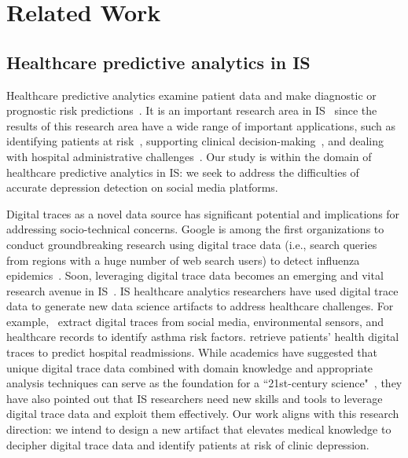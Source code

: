 \section{Related Work} \label{sec:related}

\subsection{Healthcare predictive analytics in IS}\label{sec:related:one}

Healthcare predictive analytics examine patient data and make diagnostic or prognostic risk predictions~\citep{shmueli_predictive_2011}. It is an important research area in IS~\citep{shmueli_predictive_2011} since the results of this research area have a wide range of important applications, such as identifying patients at risk~, supporting clinical decision-making~\citep{ben-assuli_trajectories_2020}, and dealing with hospital administrative challenges~\citep{meyer_machine_2014}. Our study is within the domain of healthcare predictive analytics in IS: we seek to address the difficulties of accurate depression detection on social media platforms. 

Digital traces as a novel data source has significant potential and implications for addressing socio-technical concerns. Google is among the first organizations to conduct groundbreaking research using digital trace data (i.e., search queries from regions with a huge number of web search users) to detect influenza epidemics~\citep{ginsberg_detecting_2009}. Soon, leveraging digital trace data becomes an  emerging and vital research avenue in IS~. IS healthcare analytics researchers have used digital trace data to generate new data science artifacts to address healthcare challenges. For example,~\cite{wenli_zhang_comprehensive_2020} extract digital traces from social media, environmental sensors, and healthcare records to identify asthma risk factors.  retrieve patients' health digital traces to predict hospital readmissions. While academics have suggested that unique digital trace data combined with domain knowledge and appropriate analysis techniques can serve as the foundation for a ``21st-century science"~, they have also pointed out that IS researchers need new skills and tools to leverage digital trace data and exploit them effectively. Our work aligns with this research direction: we intend to design a new artifact that elevates medical knowledge to decipher digital trace data and identify patients at risk of clinic depression. 


